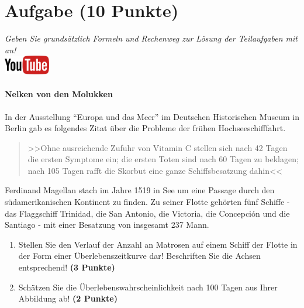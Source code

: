 \documentclass[a4paper, 9pt]{scrartcl}\usepackage[]{graphicx}\usepackage[]{xcolor}
\begin{document}
 
\clearpage

\section{Aufgabe \hfill (10 Punkte)}

\textit{Geben Sie grunds{\"a}tzlich Formeln und Rechenweg zur L{\"o}sung der
  Teilaufgaben mit an!} \\[1Ex]

\hfill\href{https://youtu.be/1B53cVFIU7Q}{\includegraphics[width =
  2cm]{img/youtube}} %
\hspace{2Ex}

\paragraph{Nelken von den Molukken}



In der Ausstellung "`Europa und das Meer"' im Deutschen Historischen Museum in
Berlin gab es folgendes Zitat {\"u}ber die Probleme der fr{\"u}hen Hochseeschifffahrt.

\begin{quote}
  >>Ohne ausreichende Zufuhr von Vitamin C stellen sich nach 42 Tagen die
  ersten Symptome ein; die ersten Toten sind nach 60 Tagen zu beklagen;
  nach 105 Tagen rafft die Skorbut eine ganze Schiffsbesatzung dahin<<
\end{quote}

Ferdinand Magellan stach im Jahre 1519 in See um eine Passage durch den
s{\"u}damerikanischen Kontinent zu finden. Zu seiner Flotte geh{\"o}rten
f{\"u}nf Schiffe - das Flaggschiff Trinidad, die San Antonio, die Victoria, die
Concepci{\'o}n und die Santiago - mit einer Besatzung von insgesamt
237 Mann. 

\begin{enumerate}
\item Stellen Sie den Verlauf der Anzahl an Matrosen auf einem Schiff der
  Flotte in der Form einer {\"U}berlebenszeitkurve dar! Beschriften Sie die
  Achsen entsprechend! \textbf{(3 Punkte)} 
\item Sch{\"a}tzen Sie die {\"U}berlebenswahrscheinlichkeit nach 100 Tagen
  aus Ihrer Abbildung ab! \textbf{(2 Punkte)} 
\end{enumerate}
\end{document}
